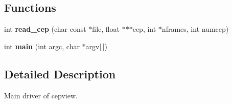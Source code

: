 \subsection*{Functions}
\begin{DoxyCompactItemize}
\item 
\mbox{\label{main__cepview_8c_ad215db6a8261bb1c920d087564a1dd87}} 
int {\bfseries read\+\_\+cep} (char const $\ast$file, float $\ast$$\ast$$\ast$cep, int $\ast$nframes, int numcep)
\item 
\mbox{\label{main__cepview_8c_a0ddf1224851353fc92bfbff6f499fa97}} 
int {\bfseries main} (int argc, char $\ast$argv[$\,$])
\end{DoxyCompactItemize}


\subsection{Detailed Description}
Main driver of cepview. 

